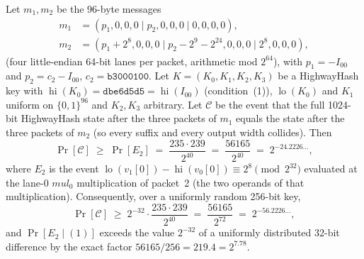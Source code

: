 
\begin{lemma}\label{lem:exact-trail}
Let $m_1,m_2$ be the 96-byte messages
\begin{align*}
m_1&=(p_1,0,0,0\mid p_2,0,0,0\mid 0,0,0,0),\\
m_2&=(p_1+2^{8},0,0,0\mid p_2-2^{9}-2^{24},0,0,0\mid 2^{8},0,0,0),
\end{align*}
(four little-endian 64-bit lanes per packet, arithmetic mod $2^{64}$), with
$p_1=-I_{00}$ and $p_2=c_2-I_{00}$, $c_2=\mathtt{b3000100}$.
Let $K=(K_0,K_1,K_2,K_3)$ be a HighwayHash key with $\operatorname{hi}(K_0)=\mathtt{dbe6d5d5}=\operatorname{hi}(I_{00})$
(condition~(1)), $\operatorname{lo}(K_0)$ and $K_1$ uniform on $\{0,1\}^{96}$ and $K_2,K_3$ arbitrary.
Let $\mathcal C$ be the event that the full 1024-bit HighwayHash state after the three packets of $m_1$
equals the state after the three packets of $m_2$ (so every suffix and every output width collides).
Then
\[
\Pr[\mathcal C]\;\ge\;\Pr[E_2]\;=\;\frac{235\cdot 239}{2^{40}}\;=\;\frac{56165}{2^{40}}\;=\;2^{-24.2226\ldots},
\]
where $E_2$ is the event $\operatorname{lo}(v_1[0])-\operatorname{hi}(v_0[0])\equiv 2^{8}\pmod{2^{32}}$ evaluated at the
lane-0 $\mathit{mul}_0$ multiplication of packet~2 (the two operands of that multiplication).
Consequently, over a uniformly random 256-bit key,
\[
\Pr[\mathcal C]\;\ge\;2^{-32}\cdot\frac{235\cdot 239}{2^{40}}\;=\;\frac{56165}{2^{72}}\;=\;2^{-56.2226\ldots},
\]
and $\Pr[E_2\mid(1)]$ exceeds the value $2^{-32}$ of a uniformly distributed 32-bit difference by the exact
factor $56165/256=219.4=2^{7.78}$.
\end{lemma}

